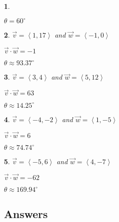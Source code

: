 \documentclass{amsbook}
\newtheorem{exc}{}
\newenvironment{ex}{\begin{exc}\normalfont}{\end{exc}}
\numberwithin{section}{chapter}
\numberwithin{equation}{chapter}
\begin{document}
\begin{multicols}{2}
\begin{ex}
\begin{sol}
		$\theta =  60^{\circ}$ 
	\end{sol}
\end{ex}

\begin{ex}
	$\vec{v} = \left\langle 1, 17 \right\rangle$ and $\vec{w} = \left\langle -1, 0 \right\rangle$
	\begin{sol}
		 $\vec{v} \cdot \vec{w} = -1$
		
		$\theta \approx  93.37^{\circ}$ 
	\end{sol}
\end{ex}

\begin{ex}
	 $\vec{v} = \left\langle 3, 4 \right\rangle$ and $\vec{w} = \left\langle 5, 12 \right\rangle$
	\begin{sol}
		 $\vec{v} \cdot \vec{w} = 63$
		
		$\theta  \approx  14.25^{\circ}$ 
	\end{sol}
\end{ex}

\begin{ex}
	$\vec{v} = \left\langle -4, -2 \right\rangle$ and $\vec{w} = \left\langle 1, -5 \right\rangle$
	\begin{sol}
		 $\vec{v} \cdot \vec{w} = 6$
		
		$\theta \approx  74.74^{\circ}$ 
	\end{sol}
\end{ex}

\begin{ex}
	$\vec{v} = \left\langle -5, 6 \right\rangle$ and $\vec{w} = \left\langle 4, -7 \right\rangle$
	\begin{sol}
		 $\vec{v} \cdot \vec{w} = -62$
		
		$\theta  \approx  169.94^{\circ}$ 
	\end{sol}
\end{ex}
	\end{multicols}



\subsection*{Answers \nopunct} \hfill
\begin{multicols}{2}
	
\end{multicols}


\backmatter

\printindex
\end{document}
